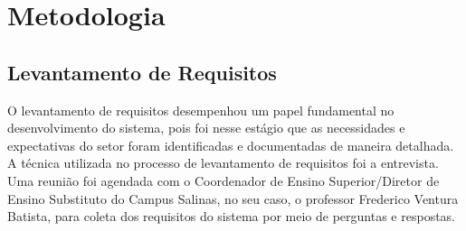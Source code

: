 \chapter{Metodologia} 
\label{cap4_metodologia}

\section{Levantamento de Requisitos}

O levantamento de requisitos desempenhou um papel fundamental no desenvolvimento do sistema, pois foi nesse estágio que as necessidades e expectativas do setor foram identificadas e documentadas de maneira detalhada. A técnica utilizada no processo de levantamento de requisitos foi a entrevista. Uma reunião foi agendada com o Coordenador de Ensino Superior/Diretor de Ensino Substituto do Campus Salinas, no seu caso, o professor Frederico Ventura Batista, para coleta dos requisitos do sistema por meio de perguntas e respostas.

